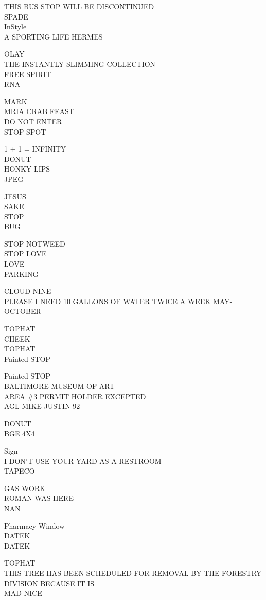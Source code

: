 \documentclass[10pt,letterpaper]{article}
\begin{document}
THIS BUS STOP WILL BE DISCONTINUED\\
SPADE\\
InStyle\\
A SPORTING LIFE HERMES

OLAY\\
THE INSTANTLY SLIMMING COLLECTION\\
FREE SPIRIT\\
RNA

MARK\\
MRIA CRAB FEAST\\
DO NOT ENTER\\
STOP SPOT

1 + 1 = INFINITY\\
DONUT\\
HONKY LIPS\\
JPEG

JESUS\\
SAKE\\
STOP\\
BUG

STOP NOTWEED\\
STOP LOVE\\
LOVE\\
PARKING

CLOUD NINE\\
PLEASE I NEED 10 GALLONS OF WATER TWICE A WEEK MAY{-}OCTOBER

TOPHAT\\
CHEEK\\
TOPHAT\\
Painted STOP

Painted STOP\\
BALTIMORE MUSEUM OF ART\\
AREA \#3 PERMIT HOLDER EXCEPTED\\
AGL MIKE JUSTIN 92

DONUT\\
BGE 4X4

Sign\\
I DON'T USE YOUR YARD AS A RESTROOM\\
TAPECO

GAS WORK\\
ROMAN WAS HERE\\
NAN

Pharmacy Window\\
DATEK\\
DATEK

TOPHAT\\
THIS TREE HAS BEEN SCHEDULED FOR REMOVAL BY THE FORESTRY DIVISION BECAUSE IT IS\\
MAD NICE
\end{document}

